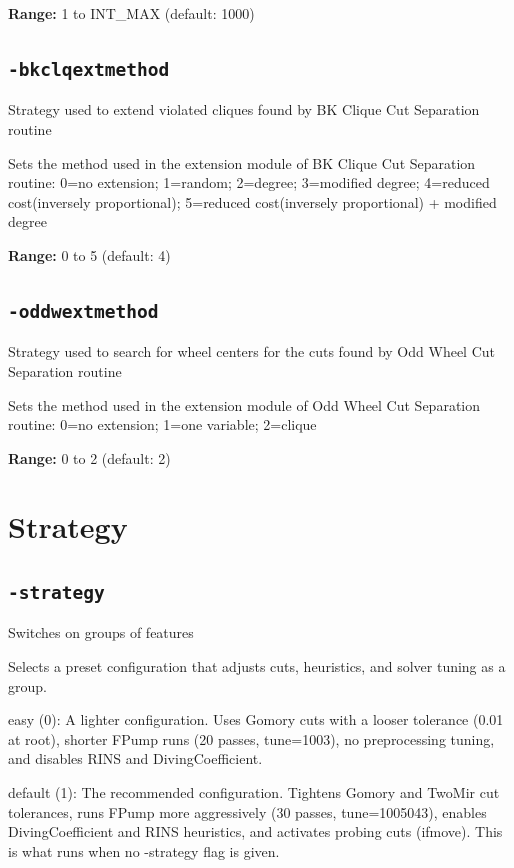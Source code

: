 \documentclass[11pt,a4paper]{article}
\begin{document}
\textbf{Range:} 1 to INT\_MAX (default: 1000)

\subsection*{\texttt{-bkclqextmethod}}

Strategy used to extend violated cliques found by BK Clique Cut Separation routine

Sets the method used in the extension module of BK Clique Cut Separation routine: 0=no extension; 1=random; 2=degree; 3=modified degree; 4=reduced cost(inversely proportional); 5=reduced cost(inversely proportional) + modified degree

\textbf{Range:} 0 to 5 (default: 4)

\subsection*{\texttt{-oddwextmethod}}

Strategy used to search for wheel centers for the cuts found by Odd Wheel Cut Separation routine

Sets the method used in the extension module of Odd Wheel Cut Separation routine: 0=no extension; 1=one variable; 2=clique

\textbf{Range:} 0 to 2 (default: 2)

\section{Strategy}

\subsection*{\texttt{-strategy}}

Switches on groups of features

Selects a preset configuration that adjusts cuts, heuristics, and solver tuning as a group.

  easy (0): A lighter configuration. Uses Gomory cuts with a looser tolerance (0.01 at root), shorter FPump runs (20 passes, tune=1003), no preprocessing tuning, and disables RINS and DivingCoefficient.

  default (1): The recommended configuration. Tightens Gomory and TwoMir cut tolerances, runs FPump more aggressively (30 passes, tune=1005043), enables DivingCoefficient and RINS heuristics, and activates probing cuts (ifmove). This is what runs when no -strategy flag is given.
\end{document}
